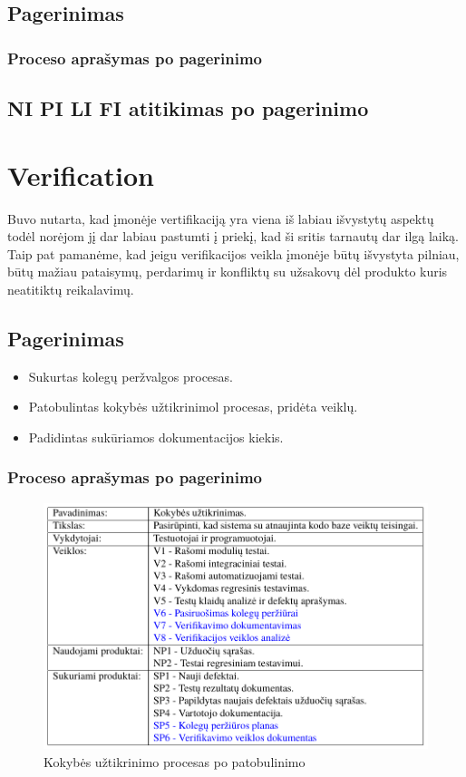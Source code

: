 \documentclass{VUMIFPSkursinis}
\begin{document}
		\subsection{Pagerinimas}
			\subsubsection{Proceso aprašymas po pagerinimo}
		\subsection{NI PI LI FI atitikimas po pagerinimo}
	\section{Verification}
		Buvo nutarta, kad įmonėje vertifikaciją yra viena iš labiau išvystytų aspektų todėl norėjom jį dar labiau pastumti į priekį, kad ši sritis tarnautų dar ilgą laiką. 
		Taip pat pamanėme, kad jeigu verifikacijos veikla įmonėje būtų išvystyta pilniau, būtų mažiau pataisymų, perdarimų ir konfliktų su užsakovų dėl produkto kuris neatitiktų reikalavimų.
		\subsection{Pagerinimas}
			\begin{itemize}
				\item{Sukurtas kolegų peržvalgos procesas.}
				\item{Patobulintas kokybės užtikrinimol procesas, pridėta veiklų.}
				\item{Padidintas sukūriamos dokumentacijos kiekis.}
			\end{itemize}
			\subsubsection{Proceso aprašymas po pagerinimo}
				\begin{figure}[!htbp]
					\includegraphics[scale=0.8]{img/kokybepo}
					\caption{Kokybės užtikrinimo procesas po patobulinimo} %
					\label{img:ProfilisPo}
				\end{figure}
\end{document}

